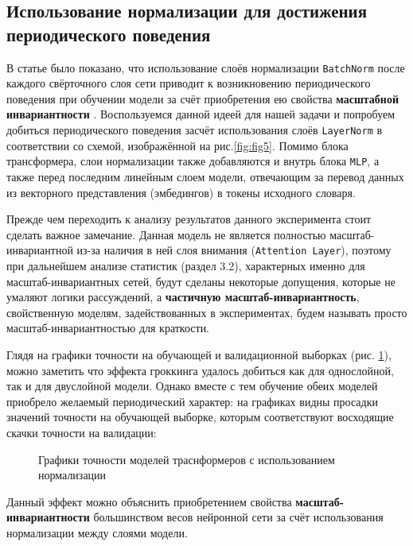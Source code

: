 \documentclass{article}
\begin{document}
\subsection{Использование нормализации для достижения периодического поведения}
В статье \cite{on_periodic_beh} было показано, что использование слоёв нормализации \verb|BatchNorm| после каждого свёрточного слоя сети приводит к возникновению периодического поведения при обучении модели за счёт приобретения ею свойства \textbf{масштабной инвариантности} \cite{si_attn, 3_rigimes}.
Воспользуемся данной идеей для нашей задачи и попробуем добиться периодического поведения засчёт использования слоёв \verb|LayerNorm| в соответствии со схемой, изображённой на рис.\ref{fig:fig5}.
Помимо блока трансформера, слои нормализации также добавляются и внутрь блока \verb|MLP|, а также перед последним линейным слоем модели, отвечающим за перевод данных из векторного представления (эмбедингов) в токены исходного словаря. 
\par Прежде чем переходить к анализу результатов данного эксперимента стоит сделать важное замечание. Данная модель не является полностью масштаб-инвариантной из-за наличия в ней слоя внимания (\verb|Attention Layer|), поэтому при дальнейшем анализе статистик (раздел 3.2), характерных именно для масштаб-инвариантных сетей, будут сделаны некоторые допущения, которые не умаляют логики рассуждений, а \textbf{частичную масштаб-инвариантность}, свойственную моделям, задействованных в экспериментах, будем называть просто масштаб-инвариантностью для краткости.
\par Глядя на графики точности на обучающей и валидационной выборках (рис. \ref{fig:fig8}), можно заметить что эффекта гроккинга удалось добиться как для однослойной, так и для двуслойной модели. Однако вместе с тем обучение обеих моделей приобрело желаемый периодический характер: на графиках видны просадки значений точности на обучающей выборке, которым соответствуют восходящие скачки точности на валидации:
\begin{figure}[h]
\centering
{}
\caption{Графики точности моделей траснформеров с использованием нормализации}
\label{fig:fig8}
\end{figure}
\par Данный эффект можно объяснить приобретением свойства \textbf{масштаб-инвариантности} большинством весов нейронной сети за счёт использования нормализации между слоями модели.
\end{document}
